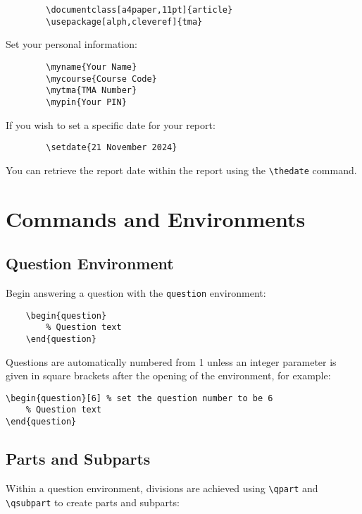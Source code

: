\documentclass[a4paper,11pt,twoside]{article}
\begin{document}
	\begin{verbatim}
		\documentclass[a4paper,11pt]{article}
		\usepackage[alph,cleveref]{tma}
	\end{verbatim}
	
	Set your personal information:
	
	\begin{verbatim}
		\myname{Your Name}
		\mycourse{Course Code}
		\mytma{TMA Number}
		\mypin{Your PIN}
	\end{verbatim}
	
	If you wish to set a specific date for your report:
	
	\begin{verbatim}
		\setdate{21 November 2024}
	\end{verbatim}
	
	You can retrieve the report date within the report using the \verb|\thedate| command.
	
	\section{Commands and Environments}
	
	\subsection{Question Environment}
	
	Begin answering a question with the \texttt{question} environment:
	
	\begin{verbatim}
	\begin{question}
		% Question text
	\end{question}
\end{verbatim}

Questions are automatically numbered from 1 unless an integer parameter is given in square brackets after the opening of the environment, for example:

\begin{verbatim}
\begin{question}[6] % set the question number to be 6
	% Question text
\end{question}
\end{verbatim}

\subsection{Parts and Subparts}

Within a question environment, divisions are achieved using \verb|\qpart| and \verb|\qsubpart| to create parts and subparts:
\end{document}
